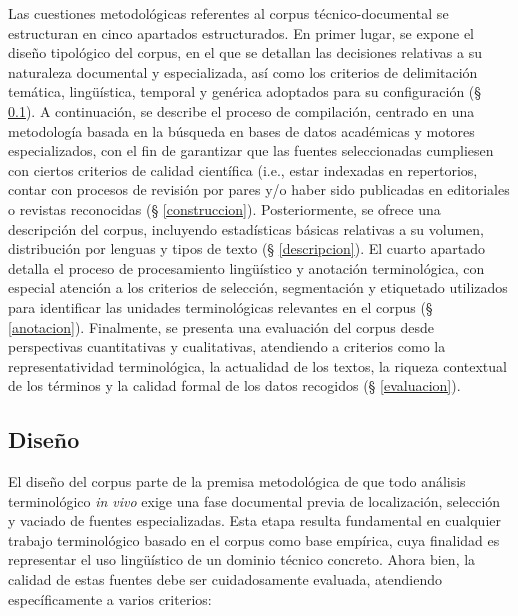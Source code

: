 Las cuestiones metodológicas referentes al corpus técnico-documental se estructuran en cinco apartados estructurados. En primer lugar, se expone el diseño tipológico del corpus, en el que se detallan las decisiones relativas a su naturaleza documental y especializada, así como los criterios de delimitación temática, lingüística, temporal y genérica adoptados para su configuración (§ \ref{diseño}). A continuación, se describe el proceso de compilación, centrado en una metodología basada en la búsqueda en bases de datos académicas y motores especializados, con el fin de garantizar que las fuentes seleccionadas cumpliesen con ciertos criterios de calidad científica (i.e., estar indexadas en repertorios, contar con procesos de revisión por pares y/o haber sido publicadas en editoriales o revistas reconocidas (§ \ref{construccion}). Posteriormente, se ofrece una descripción del corpus, incluyendo estadísticas básicas relativas a su volumen, distribución por lenguas y tipos de texto (§ \ref{descripcion}). El cuarto apartado detalla el proceso de procesamiento lingüístico y anotación terminológica, con especial atención a los criterios de selección, segmentación y etiquetado utilizados para identificar las unidades terminológicas relevantes en el corpus (§ \ref{anotacion}). Finalmente, se presenta una evaluación del corpus desde perspectivas cuantitativas y cualitativas, atendiendo a criterios como la representatividad terminológica, la actualidad de los textos, la riqueza contextual de los términos y la calidad formal de los datos recogidos (§ \ref{evaluacion}).

\subsection{Diseño} \label{diseño}

El diseño del corpus parte de la premisa metodológica de que todo análisis terminológico \emph{in vivo} exige una fase documental previa de localización, selección y vaciado de fuentes especializadas. Esta etapa resulta fundamental en cualquier trabajo terminológico basado en el corpus como base empírica, cuya finalidad es representar el uso lingüístico de un dominio técnico concreto. Ahora bien, la calidad de estas fuentes debe ser cuidadosamente evaluada, atendiendo específicamente a varios criterios:

